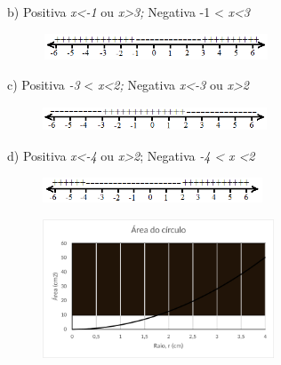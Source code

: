\begin{enumerate}[label=\thechapter.\arabic*]
\begin{multicols}{2}
b) Positiva \textit{x<-1} ou  \textit{x>3; }Negativa -1 <  \textit{x<3}

\begin{figure}[H]
	\begin{Center}
		\includegraphics[width=2.66in,height=0.31in]{capitulos/funcao_do_segundo_grau/media/image33.png}
	\end{Center}
\end{figure}
\end{multicols}

\begin{multicols}{2}
c) Positiva \textit{-3} < \textit{x<2; }Negativa \textit{x<-3} ou \textit{x>2}

\begin{figure}[H]
	\begin{Center}
		\includegraphics[width=2.62in,height=0.29in]{capitulos/funcao_do_segundo_grau/media/image34.png}
	\end{Center}
\end{figure}
\end{multicols}

\begin{multicols}{2}
d) Positiva \textit{x<-4} ou \textit{x>2}; Negativa \textit{-4 < } \textit{x <2}

\begin{figure}[H]
	\begin{Center}
		\includegraphics[width=2.57in,height=0.3in]{capitulos/funcao_do_segundo_grau/media/image35.png}
	\end{Center}
\end{figure}
\end{multicols}

\ansitem{}

\begin{figure}[H]
	\begin{Center}
		\includegraphics[width=2.71in,height=1.63in]{capitulos/funcao_do_segundo_grau/media/image36.pdf}
	\end{Center}
\end{figure}


\end{enumerate}
